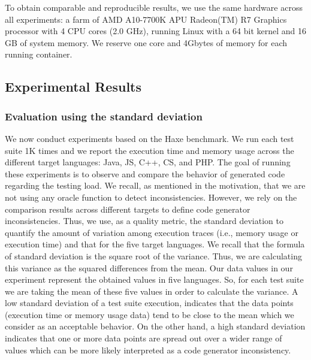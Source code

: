 To obtain comparable and reproducible results, we use the same hardware across all experiments: a farm of AMD A10-7700K APU Radeon(TM) R7 Graphics processor with 4 CPU cores (2.0 GHz), running Linux with a 64 bit kernel and 16 GB of system memory. We reserve one core and 4Gbytes of memory for each running container. 

\subsection{Experimental Results}
\subsubsection{Evaluation using the standard deviation}
We now conduct experiments based on the Haxe benchmark. We run each test suite 1K times and we report the execution time and memory usage across the different target languages: Java, JS, C++, CS, and PHP. 
The goal of running these experiments is to observe and compare the behavior of generated code regarding the testing load. We recall, as mentioned in the motivation, that we are not using any oracle function to detect inconsistencies. However, we rely on the comparison results across different targets to define code generator inconsistencies.
Thus, we use, as a quality metric, the standard deviation to quantify the amount of variation among execution traces (i.e., memory usage or execution time) and that for the five target languages. We recall that the formula of standard deviation is the square root of the variance. Thus, we are calculating this variance as the squared differences from the mean. Our data values in our experiment represent the obtained values in five languages. So, for each test suite we are taking the mean of these five values in order to calculate the variance.
A low standard deviation of a test suite execution, indicates that the data points (execution time or memory usage data) tend to be close to the mean which we consider as an acceptable behavior.  
On the other hand, a high standard deviation indicates that one or more data points are spread out over a wider range of values which can be more likely interpreted as a code generator inconsistency. 



